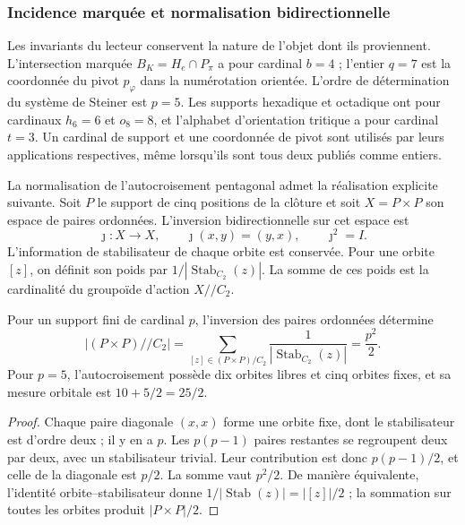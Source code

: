 \subsubsection{Incidence marquée et normalisation bidirectionnelle}
\label{ii:sec:ii09-normalizacion-bidireccional}

Les invariants du lecteur conservent la nature de l'objet dont ils
proviennent. L'intersection marquée $B_K=H_e\cap P_\pi$ a pour cardinal
$b=4$ ; l'entier $q=7$ est la coordonnée du pivot $p_\varphi$ dans la
numérotation orientée. L'ordre de détermination du système de Steiner
est $p=5$. Les supports hexadique et octadique ont pour cardinaux $h_6=6$
et $o_8=8$, et l'alphabet d'orientation tritique a pour cardinal $t=3$.
Un cardinal de support et une coordonnée de pivot sont utilisés par
leurs applications respectives, même lorsqu'ils sont tous deux publiés comme entiers.

La normalisation de l'autocroisement pentagonal admet la
réalisation explicite suivante. Soit $P$ le support de cinq positions de la clôture
et soit $X=P\times P$ son espace de paires ordonnées. L'inversion
bidirectionnelle sur cet espace est
\[
 \jmath:X\longrightarrow X,\qquad \jmath(x,y)=(y,x),
 \qquad\jmath^2=I.
\]
L'information de stabilisateur de chaque orbite est conservée. Pour une
orbite $[z]$, on définit son poids par
$1/|\operatorname{Stab}_{C_2}(z)|$. La somme de ces poids est la
cardinalité du groupoïde d'action $X/\!/C_2$.

\begin{proposition}
\label{ii:prop:ii09-semicuadrado-orbital}
Pour un support fini de cardinal $p$, l'inversion des paires ordonnées
détermine
\[
 |(P\times P)/\!/C_2|
 =\sum_{[z]\in(P\times P)/C_2}
      \frac1{|\operatorname{Stab}_{C_2}(z)|}
 =\frac{p^2}{2}.
\]
Pour $p=5$, l'autocroisement possède dix orbites libres et cinq orbites
fixes, et sa mesure orbitale est $10+5/2=25/2$.
\end{proposition}
\begin{proof}
Chaque paire diagonale $(x,x)$ forme une orbite fixe, dont le stabilisateur
est d'ordre deux ; il y en a $p$. Les $p(p-1)$ paires restantes se
regroupent deux par deux, avec un stabilisateur trivial. Leur contribution est
donc $p(p-1)/2$, et celle de la diagonale est $p/2$. La somme vaut
$p^2/2$. De manière équivalente, l'identité orbite--stabilisateur donne
$1/|\operatorname{Stab}(z)|=|[z]|/2$ ; la sommation sur toutes les orbites
produit $|P\times P|/2$.
\end{proof}

